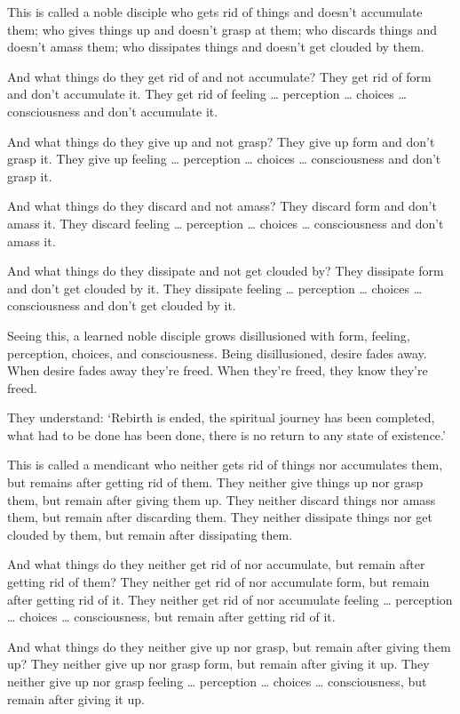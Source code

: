 \documentclass[12pt,openany]{book}%
\begin{document}
This is called a noble disciple who gets rid of things and doesn’t accumulate them; who gives things up and doesn’t grasp at them; who discards things and doesn’t amass them; who dissipates things and doesn’t get clouded by them. 

And what things do they get rid of and not accumulate? They get rid of form and don’t accumulate it. They get rid of feeling … perception … choices … consciousness and don’t accumulate it. 

And what things do they give up and not grasp? They give up form and don’t grasp it. They give up feeling … perception … choices … consciousness and don’t grasp it. 

And what things do they discard and not amass? They discard form and don’t amass it. They discard feeling … perception … choices … consciousness and don’t amass it. 

And what things do they dissipate and not get clouded by? They dissipate form and don’t get clouded by it. They dissipate feeling … perception … choices … consciousness and don’t get clouded by it. 

Seeing this, a learned noble disciple grows disillusioned with form, feeling, perception, choices, and consciousness. Being disillusioned, desire fades away. When desire fades away they’re freed. When they’re freed, they know they’re freed. 

They understand: ‘Rebirth is ended, the spiritual journey has been completed, what had to be done has been done, there is no return to any state of existence.’ 

This is called a mendicant who neither gets rid of things nor accumulates them, but remains after getting rid of them. They neither give things up nor grasp them, but remain after giving them up. They neither discard things nor amass them, but remain after discarding them. They neither dissipate things nor get clouded by them, but remain after dissipating them. 

And what things do they neither get rid of nor accumulate, but remain after getting rid of them? They neither get rid of nor accumulate form, but remain after getting rid of it. They neither get rid of nor accumulate feeling … perception … choices … consciousness, but remain after getting rid of it. 

And what things do they neither give up nor grasp, but remain after giving them up? They neither give up nor grasp form, but remain after giving it up. They neither give up nor grasp feeling … perception … choices … consciousness, but remain after giving it up. 
\end{document}
